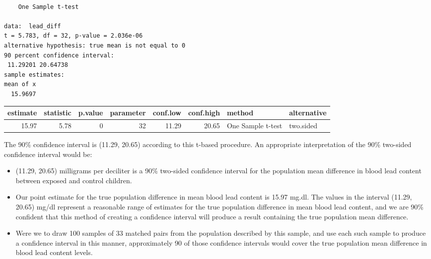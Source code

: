 \documentclass[
]{book}
\newenvironment{Shaded}{\begin{snugshade}}{\end{snugshade}}
\newcommand{\DataTypeTok}[1]{\textcolor[rgb]{0.13,0.29,0.53}{#1}}
\newcommand{\DecValTok}[1]{\textcolor[rgb]{0.00,0.00,0.81}{#1}}
\newcommand{\FloatTok}[1]{\textcolor[rgb]{0.00,0.00,0.81}{#1}}
\newcommand{\KeywordTok}[1]{\textcolor[rgb]{0.13,0.29,0.53}{\textbf{#1}}}
\newcommand{\NormalTok}[1]{#1}
\newcommand{\OperatorTok}[1]{\textcolor[rgb]{0.81,0.36,0.00}{\textbf{#1}}}
\newcommand{\StringTok}[1]{\textcolor[rgb]{0.31,0.60,0.02}{#1}}
\providecommand{\tightlist}{%
  \setlength{\itemsep}{0pt}\setlength{\parskip}{0pt}}
\begin{document}
\begin{Shaded}
\end{Shaded}

\begin{verbatim}

	One Sample t-test

data:  lead_diff
t = 5.783, df = 32, p-value = 2.036e-06
alternative hypothesis: true mean is not equal to 0
90 percent confidence interval:
 11.29201 20.64738
sample estimates:
mean of x 
  15.9697 
\end{verbatim}

\begin{Shaded}
\end{Shaded}

\begin{tabular}{r|r|r|r|r|r|l|l}
\hline
estimate & statistic & p.value & parameter & conf.low & conf.high & method & alternative\\
\hline
15.97 & 5.78 & 0 & 32 & 11.29 & 20.65 & One Sample t-test & two.sided\\
\hline
\end{tabular}

The 90\% confidence interval is (11.29, 20.65) according to this t-based procedure. An appropriate interpretation of the 90\% two-sided confidence interval would be:

\begin{itemize}
\tightlist
\item
  (11.29, 20.65) milligrams per deciliter is a 90\% two-sided confidence interval for the population mean difference in blood lead content between exposed and control children.
\item
  Our point estimate for the true population difference in mean blood lead content is 15.97 mg.dl. The values in the interval (11.29, 20.65) mg/dl represent a reasonable range of estimates for the true population difference in mean blood lead content, and we are 90\% confident that this method of creating a confidence interval will produce a result containing the true population mean difference.
\item
  Were we to draw 100 samples of 33 matched pairs from the population described by this sample, and use each such sample to produce a confidence interval in this manner, approximately 90 of those confidence intervals would cover the true population mean difference in blood lead content levels.
\end{itemize}
\end{document}
